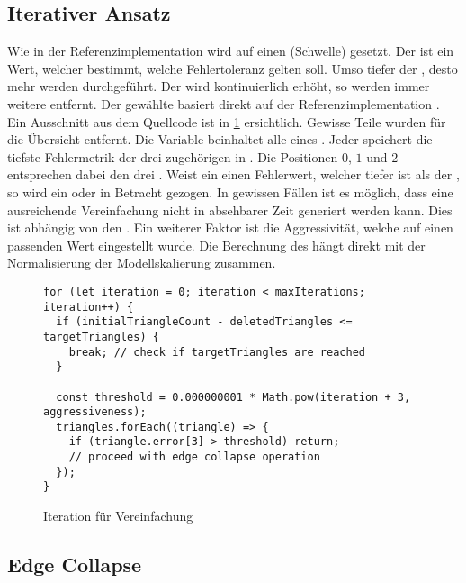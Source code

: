 \subsection{Iterativer Ansatz}

Wie in der Referenzimplementation wird auf einen  (Schwelle) gesetzt. Der  ist ein Wert, welcher bestimmt, welche Fehlertoleranz gelten soll. Umso tiefer der , desto mehr  werden durchgeführt. Der  wird kontinuierlich erhöht, so werden immer weitere  entfernt. Der gewählte  basiert direkt auf der Referenzimplementation \cite{fastQuadricMeshSimplification}. Ein Ausschnitt aus dem Quellcode ist in \ref{code:thresholdIteration} ersichtlich. Gewisse Teile wurden für die Übersicht entfernt. Die Variable  beinhaltet alle  eines . Jeder  speichert die tiefste Fehlermetrik der drei zugehörigen  in . Die Positionen $0$, $1$ und $2$ entsprechen dabei den drei . Weist ein  einen Fehlerwert, welcher tiefer ist als der , so wird ein  oder  in Betracht gezogen. In gewissen Fällen ist es möglich, dass eine ausreichende Vereinfachung nicht in absehbarer Zeit generiert werden kann. Dies ist abhängig von den . Ein weiterer Faktor ist die Aggressivität, welche auf einen passenden Wert eingestellt wurde. Die Berechnung des  hängt direkt mit der Normalisierung der Modellskalierung zusammen.

\begin{figure}[H]
  \begin{lstlisting}[style=JavaScript]
for (let iteration = 0; iteration < maxIterations; iteration++) {
  if (initialTriangleCount - deletedTriangles <= targetTriangles) {
    break; // check if targetTriangles are reached
  }

  const threshold = 0.000000001 * Math.pow(iteration + 3, aggressiveness);
  triangles.forEach((triangle) => {
    if (triangle.error[3] > threshold) return;
    // proceed with edge collapse operation
  });
}
  \end{lstlisting}
  \caption{Iteration für Vereinfachung}
  \label{code:thresholdIteration}
\end{figure}


\subsection{Edge Collapse}


